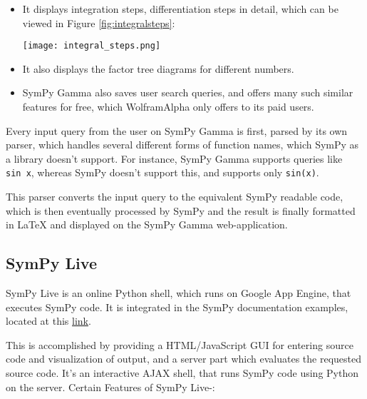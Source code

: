 \begin{itemize}
\item
  It displays integration steps, differentiation steps in detail, which
  can be viewed in Figure \ref{fig:integralsteps}:\par
\begin{minipage}{\textwidth}
    \centering
    \texttt{[image: integral\_steps.png]}
    \label{fig:integralsteps}
\end{minipage}
\item
  It also displays the factor tree diagrams for different numbers.
\item
  SymPy Gamma also saves user search queries, and offers many such 
  similar features for free, which Wolfram\textbar{}Alpha only offers 
  to its paid users.
\end{itemize}
Every input query from the user on SymPy Gamma is first, parsed by its
own parser, which handles several different forms of function names,
which SymPy as a library doesn't support. For instance, SymPy Gamma
supports queries like \texttt{sin\ x}, whereas SymPy doesn't support
this, and supports only \texttt{sin(x)}.

This parser converts the input query to the equivalent SymPy readable 
code, which is then eventually processed by SymPy and the result is 
finally formatted in LaTeX and displayed on the SymPy Gamma web-application.

\subsection{SymPy Live}\label{sympy-live}

SymPy Live is an online Python shell, which runs on Google
App Engine, that executes SymPy code. It is integrated in the SymPy
documentation examples, located at this \href{http://docs.sympy.org/latest/index.html}{link}.

This is accomplished by providing a HTML/JavaScript GUI for entering
source code and visualization of output, and a server part which
evaluates the requested source code. It's an interactive AJAX shell,
that runs SymPy code using Python on the server.
\newline
Certain Features of SymPy Live-:

